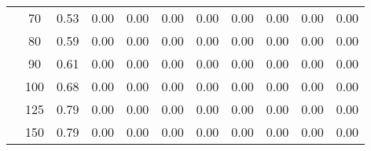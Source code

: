 \begin{table}[t]
\begin{center}
\begin{subtable}[c]{\textwidth}
\begin{center}
\begin{tabular}{rcccccccccc}
                                        & \multicolumn{1}{c|}{70}  & \num{0.53}  & \num{0.00}  & \num{0.00}  & \num{0.00}  & \num{0.00}  & \num{0.00}  & \num{0.00}  & \num{0.00}  & \num{0.00}  \\
                                        & \multicolumn{1}{c|}{80}  & \num{0.59}  & \num{0.00}  & \num{0.00}  & \num{0.00}  & \num{0.00}  & \num{0.00}  & \num{0.00}  & \num{0.00}  & \num{0.00}  \\
                                        & \multicolumn{1}{c|}{90}  & \num{0.61}  & \num{0.00}  & \num{0.00}  & \num{0.00}  & \num{0.00}  & \num{0.00}  & \num{0.00}  & \num{0.00}  & \num{0.00}  \\
                                        & \multicolumn{1}{c|}{100}  & \num{0.68}  & \num{0.00}  & \num{0.00}  & \num{0.00}  & \num{0.00}  & \num{0.00}  & \num{0.00}  & \num{0.00}  & \num{0.00}  \\
                                        & \multicolumn{1}{c|}{125}  & \num{0.79}  & \num{0.00}  & \num{0.00}  & \num{0.00}  & \num{0.00}  & \num{0.00}  & \num{0.00}  & \num{0.00}  & \num{0.00}  \\
                                        & \multicolumn{1}{c|}{150}  & \num{0.79}  & \num{0.00}  & \num{0.00}  & \num{0.00}  & \num{0.00}  & \num{0.00}  & \num{0.00}  & \num{0.00}  & \num{0.00}  \\
                                    \end{tabular}
            \end{center}
        \end{subtable}

        \vspace{5mm}


\end{center}
\end{table}
